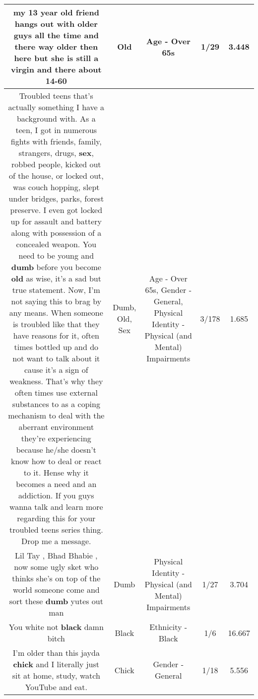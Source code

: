 \documentclass[11pt]{article}
\newlength\mylength
\begin{document}
\begin{center}
\begin{longtable}{|C{.65\mylength}|C{.30\mylength}|C{.12\mylength}|C{.12\mylength}|C{.12\mylength}|}
  \small my 13 year \textbf{old} friend hangs out with older guys all the time and there way older then here but she is still a virgin and there about 14-60\normalsize   & Old & Age - Over 65s & 1/29 & 3.448 \\  \hline
  \small Troubled teens that's actually something I have a background with. As a teen, I got in numerous fights with friends, family, strangers, drugs, \textbf{sex}, robbed people, kicked out of the house, or locked out, was couch hopping, slept under bridges, parks, forest preserve. I even got locked up for assault and battery along with possession of a concealed weapon. You need to be young and \textbf{dumb} before you become \textbf{old} as wise, it's a sad but true statement. Now, I'm not saying this to brag by any means. When someone is troubled like that they have reasons for it, often times bottled up and do not want to talk about it cause it's a sign of weakness. That's why they often times use external substances to as a coping mechanism to deal with the aberrant environment they're experiencing because he/she doesn't know how to deal or react to it. Hense why it becomes a need and an addiction. If you guys wanna talk and learn more regarding this for your troubled teens series thing. Drop me a message.\normalsize   & Dumb, Old, Sex & Age - Over 65s, Gender - General, Physical Identity - Physical (and Mental) Impairments & 3/178 & 1.685 \\  \hline
  \small Lil Tay , Bhad Bhabie , now some ugly sket who thinks she's on top of the world someone come and sort these \textbf{dumb} yutes out man\normalsize   & Dumb & Physical Identity - Physical (and Mental) Impairments & 1/27 & 3.704 \\  \hline
  \small You white not \textbf{black} damn bitch\normalsize   & Black & Ethnicity - Black & 1/6 & 16.667 \\  \hline
  \small I'm older than this jayda \textbf{chick} and I literally just sit at home, study, watch YouTube and eat.\normalsize   & Chick & Gender - General & 1/18 & 5.556 \\  \hline

\end{longtable}
\end{center}
\end{document}
